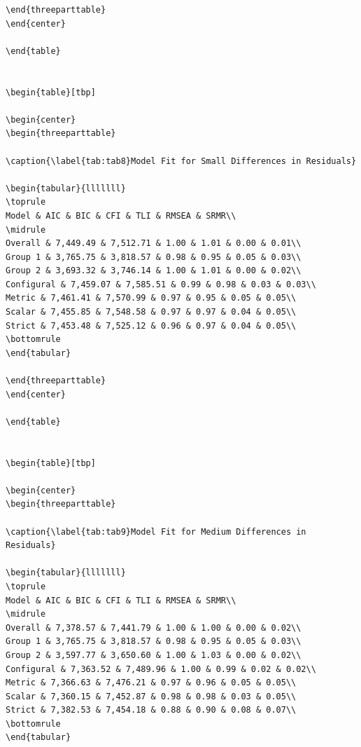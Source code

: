 \documentclass[
  man]{apa6}
\begin{document}
\begin{verbatim}
\end{threeparttable}
\end{center}

\end{table}


\begin{table}[tbp]

\begin{center}
\begin{threeparttable}

\caption{\label{tab:tab8}Model Fit for Small Differences in Residuals}

\begin{tabular}{lllllll}
\toprule
Model & AIC & BIC & CFI & TLI & RMSEA & SRMR\\
\midrule
Overall & 7,449.49 & 7,512.71 & 1.00 & 1.01 & 0.00 & 0.01\\
Group 1 & 3,765.75 & 3,818.57 & 0.98 & 0.95 & 0.05 & 0.03\\
Group 2 & 3,693.32 & 3,746.14 & 1.00 & 1.01 & 0.00 & 0.02\\
Configural & 7,459.07 & 7,585.51 & 0.99 & 0.98 & 0.03 & 0.03\\
Metric & 7,461.41 & 7,570.99 & 0.97 & 0.95 & 0.05 & 0.05\\
Scalar & 7,455.85 & 7,548.58 & 0.97 & 0.97 & 0.04 & 0.05\\
Strict & 7,453.48 & 7,525.12 & 0.96 & 0.97 & 0.04 & 0.05\\
\bottomrule
\end{tabular}

\end{threeparttable}
\end{center}

\end{table}


\begin{table}[tbp]

\begin{center}
\begin{threeparttable}

\caption{\label{tab:tab9}Model Fit for Medium Differences in Residuals}

\begin{tabular}{lllllll}
\toprule
Model & AIC & BIC & CFI & TLI & RMSEA & SRMR\\
\midrule
Overall & 7,378.57 & 7,441.79 & 1.00 & 1.00 & 0.00 & 0.02\\
Group 1 & 3,765.75 & 3,818.57 & 0.98 & 0.95 & 0.05 & 0.03\\
Group 2 & 3,597.77 & 3,650.60 & 1.00 & 1.03 & 0.00 & 0.02\\
Configural & 7,363.52 & 7,489.96 & 1.00 & 0.99 & 0.02 & 0.02\\
Metric & 7,366.63 & 7,476.21 & 0.97 & 0.96 & 0.05 & 0.05\\
Scalar & 7,360.15 & 7,452.87 & 0.98 & 0.98 & 0.03 & 0.05\\
Strict & 7,382.53 & 7,454.18 & 0.88 & 0.90 & 0.08 & 0.07\\
\bottomrule
\end{tabular}


\end{verbatim}
\end{document}
